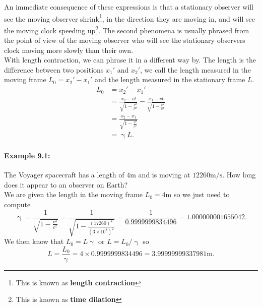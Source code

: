 \documentclass[a4paper,12pt]{book}
\begin{document}
An immediate consequence of these expressions is that a stationary observer will see the moving observer shrink\footnote{This is known as \textbf{length contraction}}, in the direction they are moving in, and will see the moving clock speeding up\footnote{This is known as \textbf{time dilation}}. The second phenomena is usually phrased from the point of view of the moving observer who will see the stationary observers clock moving more slowly than their own.\\

With length contraction, we can phrase it in a different way by. The length is the difference between two positions $x_{1}'$ and $x_{2}'$, we call the length measured in the moving frame $L_{0}=x_{2}'-x_{1}'$ and the length measured in the stationary frame $L$.
\begin{align*}
L_{0}&=x_{2}'-x_{1}'\\
	&=\frac{x_{2}-vt}{\sqrt{1-\frac{v^{2}}{c^{2}}}}-\frac{x_{1}-vt}{\sqrt{1-\frac{v^{2}}{c^{2}}}}\\
	&=\frac{x_{2}-x_{1}}{\sqrt{1-\frac{v^{2}}{c^{2}}}}\\
	&=\upgamma L.
\end{align*}

\paragraph{Example 9.1:} The Voyager spacecraft has a length of $4\text{m}$ and is moving at $12 260\text{m/s}$. How long does it appear to an observer on Earth?\\

We are given the length in the moving frame $L_{0}=4\text{m}$ so we just need to compute 
\begin{equation*}
\upgamma=\frac{1}{\sqrt{1-\frac{v^{2}}{c^{2}}}}=\frac{1}{\sqrt{1-\frac{(17260)^{2}}{(3\times10^{8})^{2}}}}=\frac{1}{0.9999999834496}=1.000000001655042.
\end{equation*}
We then know that $L_{0}=L\upgamma$ or $L=L_{0}/\upgamma$ so
\begin{equation*}
L=\frac{L_{0}}{\upgamma}=4\times0.9999999834496=3.99999999337981\text{m}.
\end{equation*}
\end{document}
